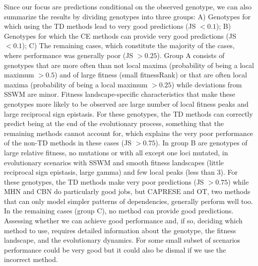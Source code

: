 \documentclass[a4paper,10pt]{article}
\newcommand{\idea}[1]{\textcolor{red}{#1}}
\begin{document}
Since our focus are predictions conditional on the observed genotype, we
can also summarize the results by dividing genotypes into three groups: A)
Genotypes for which using the TD methods lead to very good predictions (JS
$< 0.1$); B) Genotypes for which the CE methods can provide very good
predictions (JS $< 0.1$); C) The remaining cases, which constitute the
majority of the cases, where performance was generally poor (JS $> 0.25$).
Group A consists of genotypes that are more often than not local maxima
(probability of being a local maximum $>0.5$) and of large fitness (small
fitnessRank) or that are often local maxima (probability of being a local
maximum $>0.25$) while deviations from SSWM are minor. Fitness
landscape-specific characteristics that make these genotypes 
more likely to be observed
are large number of local fitness peaks and large reciprocal sign epistasis.
For these genotypes, the TD methods can
correctly predict being at the end of the evolutionary process, something
that the remaining methods cannot account for, which explains the very
poor performance of the non-TD methods in these cases (JS $> 0.75$). In
group B are genotypes of large relative fitness, no mutations or with all
except one loci mutated, in evolutionary scenarios with SSWM and smooth
fitness landscapes (little reciprocal sign epistasis, large gamma) and few
local peaks (less than 3). For these genotypes, the TD methods make very
poor predictions (JS $> 0.75$) while MHN and CBN do particularly good jobs, but
CAPRESE and OT, two methods that can only model simpler patterns of
dependencies, generally perform well too. In the remaining cases (group
C), no method can provide good predictions. Assessing whether we can
achieve good performance and, if so, deciding
which method
to use, requires detailed information about the genotype, the fitness
landscape, and the evolutionary dynamics. For some small subset of
scenarios performance could be very good but it could also be dismal if we
use the incorrect method.

\end{document}
